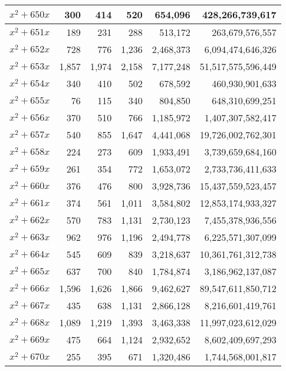 \documentclass[a4paper]{amsproc}
\theoremstyle{plain}
\theoremstyle{named}
\begin{document}
\begin{longtable}{ | l | r | r | r | r | r | }
$x^2 + 650x$ & 300 & 414 & 520 & 654{,}096 & 428{,}266{,}739{,}617 \\ \hline
$x^2 + 651x$ & 189 & 231 & 288 & 513{,}172 & 263{,}679{,}576{,}557 \\ \hline
$x^2 + 652x$ & 728 & 776 & 1{,}236 & 2{,}468{,}373 & 6{,}094{,}474{,}646{,}326 \\ \hline
$x^2 + 653x$ & 1{,}857 & 1{,}974 & 2{,}158 & 7{,}177{,}248 & 51{,}517{,}575{,}596{,}449 \\ \hline
$x^2 + 654x$ & 340 & 410 & 502 & 678{,}592 & 460{,}930{,}901{,}633 \\ \hline
$x^2 + 655x$ & 76 & 115 & 340 & 804{,}850 & 648{,}310{,}699{,}251 \\ \hline
$x^2 + 656x$ & 370 & 510 & 766 & 1{,}185{,}972 & 1{,}407{,}307{,}582{,}417 \\ \hline
$x^2 + 657x$ & 540 & 855 & 1{,}647 & 4{,}441{,}068 & 19{,}726{,}002{,}762{,}301 \\ \hline
$x^2 + 658x$ & 224 & 273 & 609 & 1{,}933{,}491 & 3{,}739{,}659{,}684{,}160 \\ \hline
$x^2 + 659x$ & 261 & 354 & 772 & 1{,}653{,}072 & 2{,}733{,}736{,}411{,}633 \\ \hline
$x^2 + 660x$ & 376 & 476 & 800 & 3{,}928{,}736 & 15{,}437{,}559{,}523{,}457 \\ \hline
$x^2 + 661x$ & 374 & 561 & 1{,}011 & 3{,}584{,}802 & 12{,}853{,}174{,}933{,}327 \\ \hline
$x^2 + 662x$ & 570 & 783 & 1{,}131 & 2{,}730{,}123 & 7{,}455{,}378{,}936{,}556 \\ \hline
$x^2 + 663x$ & 962 & 976 & 1{,}196 & 2{,}494{,}778 & 6{,}225{,}571{,}307{,}099 \\ \hline
$x^2 + 664x$ & 545 & 609 & 839 & 3{,}218{,}637 & 10{,}361{,}761{,}312{,}738 \\ \hline
$x^2 + 665x$ & 637 & 700 & 840 & 1{,}784{,}874 & 3{,}186{,}962{,}137{,}087 \\ \hline
$x^2 + 666x$ & 1{,}596 & 1{,}626 & 1{,}866 & 9{,}462{,}627 & 89{,}547{,}611{,}850{,}712 \\ \hline
$x^2 + 667x$ & 435 & 638 & 1{,}131 & 2{,}866{,}128 & 8{,}216{,}601{,}419{,}761 \\ \hline
$x^2 + 668x$ & 1{,}089 & 1{,}219 & 1{,}393 & 3{,}463{,}338 & 11{,}997{,}023{,}612{,}029 \\ \hline
$x^2 + 669x$ & 475 & 664 & 1{,}124 & 2{,}932{,}652 & 8{,}602{,}409{,}697{,}293 \\ \hline
$x^2 + 670x$ & 255 & 395 & 671 & 1{,}320{,}486 & 1{,}744{,}568{,}001{,}817 \\ \hline

\end{longtable}
\end{document}
